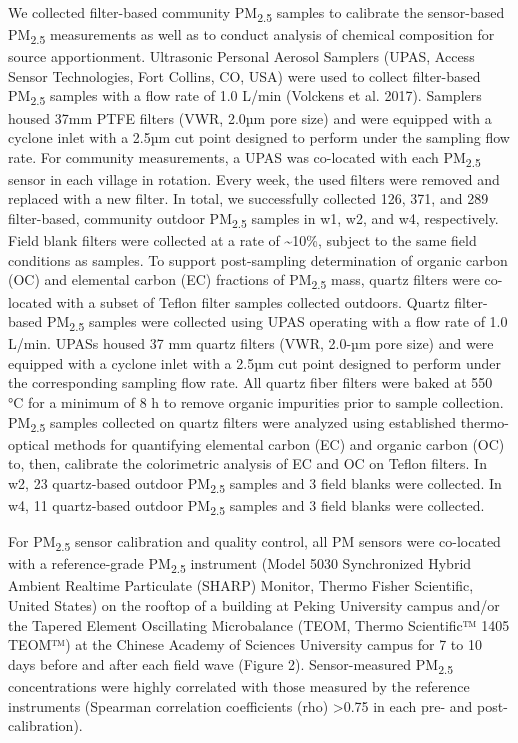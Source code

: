 \documentclass[
  letterpaper,
  DIV=11,
  numbers=noendperiod]{scrartcl}
\begin{document}
We collected filter-based community PM\textsubscript{2.5} samples to
calibrate the sensor-based PM\textsubscript{2.5} measurements as well as
to conduct analysis of chemical composition for source apportionment.
Ultrasonic Personal Aerosol Samplers (UPAS, Access Sensor Technologies,
Fort Collins, CO, USA) were used to collect filter-based
PM\textsubscript{2.5} samples with a flow rate of 1.0 L/min (Volckens et
al. 2017). Samplers housed 37mm PTFE filters (VWR, 2.0µm pore size) and
were equipped with a cyclone inlet with a 2.5µm cut point designed to
perform under the sampling flow rate. For community measurements, a UPAS
was co-located with each PM\textsubscript{2.5} sensor in each village in
rotation. Every week, the used filters were removed and replaced with a
new filter. In total, we successfully collected 126, 371, and 289
filter-based, community outdoor PM\textsubscript{2.5} samples in w1, w2,
and w4, respectively. Field blank filters were collected at a rate of
\textasciitilde10\%, subject to the same field conditions as samples. To
support post-sampling determination of organic carbon (OC) and elemental
carbon (EC) fractions of PM\textsubscript{2.5} mass, quartz filters were
co-located with a subset of Teflon filter samples collected outdoors.
Quartz filter-based PM\textsubscript{2.5} samples were collected using
UPAS operating with a flow rate of 1.0 L/min. UPASs housed 37 mm quartz
filters (VWR, 2.0-µm pore size) and were equipped with a cyclone inlet
with a 2.5µm cut point designed to perform under the corresponding
sampling flow rate. All quartz fiber filters were baked at 550 °C for a
minimum of 8 h to remove organic impurities prior to sample collection.
PM\textsubscript{2.5} samples collected on quartz filters were analyzed
using established thermo-optical methods for quantifying elemental
carbon (EC) and organic carbon (OC) to, then, calibrate the colorimetric
analysis of EC and OC on Teflon filters. In w2, 23 quartz-based outdoor
PM\textsubscript{2.5} samples and 3 field blanks were collected. In w4,
11 quartz-based outdoor PM\textsubscript{2.5} samples and 3 field blanks
were collected.

For PM\textsubscript{2.5} sensor calibration and quality control, all PM
sensors were co-located with a reference-grade PM\textsubscript{2.5}
instrument (Model 5030 Synchronized Hybrid Ambient Realtime Particulate
(SHARP) Monitor, Thermo Fisher Scientific, United States) on the rooftop
of a building at Peking University campus and/or the Tapered Element
Oscillating Microbalance (TEOM, Thermo Scientific™ 1405 TEOM™) at the
Chinese Academy of Sciences University campus for 7 to 10 days before
and after each field wave (Figure 2). Sensor-measured
PM\textsubscript{2.5} concentrations were highly correlated with those
measured by the reference instruments (Spearman correlation coefficients
(rho) \textgreater0.75 in each pre- and post-calibration).
\end{document}
